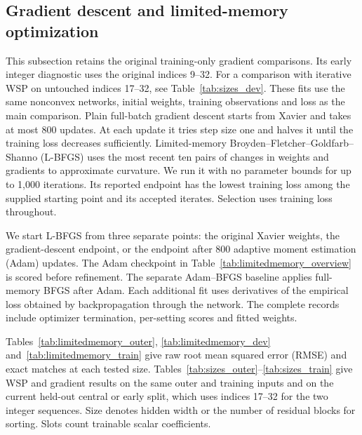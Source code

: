 \subsection{Gradient descent and limited-memory optimization}\label{app:limitedmemory}
This subsection retains the original training-only gradient comparisons. Its early integer diagnostic uses the original indices 9--32. For a comparison with iterative WSP on untouched indices 17--32, see Table~\ref{tab:sizes_dev}. These fits use the same nonconvex networks, initial weights, training observations and loss as the main comparison. Plain full-batch gradient descent starts from Xavier and takes at most 800 updates. At each update it tries step size one and halves it until the training loss decreases sufficiently. Limited-memory Broyden--Fletcher--Goldfarb--Shanno (L-BFGS) uses the most recent ten pairs of changes in weights and gradients to approximate curvature. We run it with no parameter bounds for up to 1,000 iterations. Its reported endpoint has the lowest training loss among the supplied starting point and its accepted iterates. Selection uses training loss throughout.

We start L-BFGS from three separate points: the original Xavier weights, the gradient-descent endpoint, or the endpoint after 800 adaptive moment estimation (Adam) updates. The Adam checkpoint in Table~\ref{tab:limitedmemory_overview} is scored before refinement. The separate Adam--BFGS baseline applies full-memory BFGS after Adam. Each additional fit uses derivatives of the empirical loss obtained by backpropagation through the network. The complete records include optimizer termination, per-setting scores and fitted weights.

Tables~\ref{tab:limitedmemory_outer}, \ref{tab:limitedmemory_dev} and~\ref{tab:limitedmemory_train} give raw root mean squared error (RMSE) and exact matches at each tested size. Tables~\ref{tab:sizes_outer}--\ref{tab:sizes_train} give WSP and gradient results on the same outer and training inputs and on the current held-out central or early split, which uses indices 17--32 for the two integer sequences. Size denotes hidden width or the number of residual blocks for sorting. Slots count trainable scalar coefficients.


